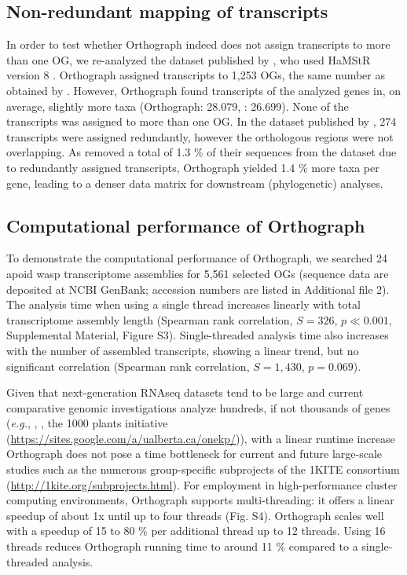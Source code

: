 \subsection{Non-redundant mapping of
transcripts}\label{non-redundant-mapping-of-transcripts}

In order to test whether Orthograph indeed does not assign transcripts
to more than one OG, we re-analyzed the dataset published by
\cite{Struck2014}, who used HaMStR version 8 \cite{Ebersberger2009}.
Orthograph assigned transcripts to 1,253 OGs, the same number as
obtained by \cite{Struck2014}. However, Orthograph found transcripts of
the analyzed genes in, on average, slightly more taxa (Orthograph:
28.079, \cite{Struck2014}: 26.699). None of the transcripts was assigned
to more than one OG. In the dataset published by \cite{Struck2014}, 274
transcripts were assigned redundantly, however the orthologous regions
were not overlapping. As \cite{Struck2014} removed a total of 1.3 \% of
their sequences from the dataset due to redundantly assigned
transcripts, Orthograph yielded 1.4 \% more taxa per gene, leading to a
denser data matrix for downstream (phylogenetic) analyses.

\subsection{Computational performance of
Orthograph}\label{computational-performance-of-orthograph}

To demonstrate the computational performance of Orthograph, we searched
24 apoid wasp transcriptome assemblies for 5,561 selected OGs (sequence
data are deposited at NCBI GenBank; accession numbers are listed in
Additional file 2). The analysis time when using a single thread
increases linearly with total transcriptome assembly length (Spearman
rank correlation, $S = 326$, $p \ll 0.001$, Supplemental Material,
Figure S3). Single-threaded analysis time also increases with the number
of assembled transcripts, showing a linear trend, but no significant
correlation (Spearman rank correlation, $S = 1,430$, $p = 0.069$).

Given that next-generation RNAseq datasets tend to be large and current
comparative genomic investigations analyze hundreds, if not thousands of
genes (\emph{e.g.}, \cite{Misof2014}, \cite{Jarvis2014}, the 1000 plants
initiative (\url{https://sites.google.com/a/ualberta.ca/onekp/})), with
a linear runtime increase Orthograph does not pose a time bottleneck for
current and future large-scale studies such as the numerous
group-specific subprojects of the 1KITE consortium
(\url{http://1kite.org/subprojects.html}). For employment in
high-performance cluster computing environments, Orthograph supports
multi-threading: it offers a linear speedup of about 1x until up to four
threads (Fig. S4). Orthograph scales well with a speedup of 15 to 80 \%
per additional thread up to 12 threads. Using 16 threads reduces
Orthograph running time to around 11 \% compared to a single-threaded
analysis.

